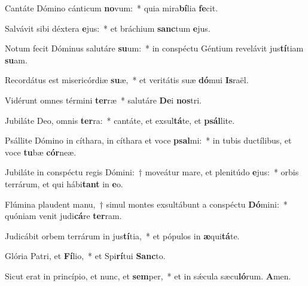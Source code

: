 \item Cantáte Dómino cánticum \textbf{no}vum:~* quia mira\textbf{bí}lia \textbf{fe}cit.

\item Salvávit sibi déxtera \textbf{e}jus:~* et bráchium \textbf{sanc}tum \textbf{e}jus.

\item Notum fecit Dóminus salutáre \textbf{su}um:~* in conspéctu Géntium revelávit jus\textbf{tí}tiam \textbf{su}am.

\item Recordátus est misericórdiæ \textbf{su}æ,~* et veritátis suæ \textbf{dó}mui \textbf{Is}raël.

\item Vidérunt omnes términi \textbf{ter}ræ~* salutáre \textbf{De}i \textbf{nos}tri.

\item Jubiláte Deo, omnis \textbf{ter}ra:~* cantáte, et exsul\textbf{tá}te, et \textbf{psál}lite.

\item Psállite Dómino in cíthara, in cíthara et voce \textbf{psal}mi:~* in tubis ductílibus, et voce \textbf{tu}bæ \textbf{cór}neæ.

\item Jubiláte in conspéctu regis Dómini:~† moveátur mare, et plenitúdo \textbf{e}jus:~* orbis terrárum, et qui hábi\textbf{tant} in \textbf{e}o.

\item Flúmina plaudent manu,~† simul montes exsultábunt a conspéctu \textbf{Dó}mini:~* quóniam venit judi\textbf{cá}re \textbf{ter}ram.

\item Judicábit orbem terrárum in jus\textbf{tí}tia,~* et pópulos in \textbf{æ}qui\textbf{tá}te.

\item Glória Patri, et \textbf{Fí}lio,~* et Spi\textbf{rí}tui \textbf{Sanc}to.

\item Sicut erat in princípio, et nunc, et \textbf{sem}per,~* et in sǽcula sæcu\textbf{ló}rum. \textbf{A}men.
